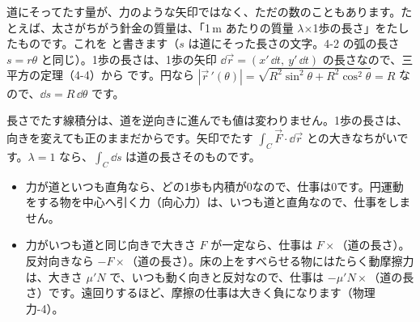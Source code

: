 
\label{bk:8-7:ds}道にそってたす量が、力のような矢印ではなく、ただの数のこともあります。たとえば、太さがちがう針金の質量は、「1\,m あたりの質量 $\lambda$×1歩の長さ」をたしたものです。これを
と書きます（$s$ は道にそった長さの文字。4-2 の弧の長さ $s=r\theta$ と同じ）。1歩の長さは、1歩の矢印 $\dd\vec r=(x'\,\dd t,\ y'\,\dd t)$ の長さなので、三平方の定理（4-4）から
です。円なら $|\vec r\,'(\theta)|=\sqrt{R^2\sin^2\theta+R^2\cos^2\theta}=R$ なので、$\dd s=R\,\dd\theta$ です。

長さでたす線積分は、道を逆向きに進んでも値は変わりません。1歩の長さは、向きを変えても正のままだからです。矢印でたす $\int_C\vec F\cdot\dd\vec r$ との大きなちがいです。$\lambda=1$ なら、$\int_C\dd s$ は道の長さそのものです。


\label{bk:8-7:raku}

\begin{itemize}[leftmargin=1.2\zw, itemsep=2pt, topsep=0pt, label={\color{\bkTT}●}]
\item 力が道といつも直角なら、どの1歩も内積が0なので、仕事は0です。円運動をする物を中心へ引く力（向心力）は、いつも道と直角なので、仕事をしません。
\item 力がいつも道と同じ向きで大きさ $F$ が一定なら、仕事は $F\times$（道の長さ）。反対向きなら $-F\times$（道の長さ）。床の上をすべらせる物にはたらく動摩擦力は、大きさ $\mu'N$ で、いつも動く向きと反対なので、仕事は $-\mu'N\times$（道の長さ）です。遠回りするほど、摩擦の仕事は大きく負になります（物理 力-4）。
\end{itemize}

